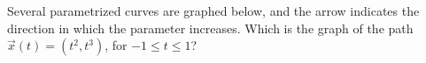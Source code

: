 \documentclass{ximera}
\begin{document}
\begin{problem}
Several parametrized curves are graphed below, and the arrow indicates the direction in which the parameter increases. Which is the graph of the path $\vec{x}(t) = (t^2, t^3)$, for $-1\leq t\leq 1$?
\begin{multipleChoice}

\end{multipleChoice}
\end{problem}
\end{document}
